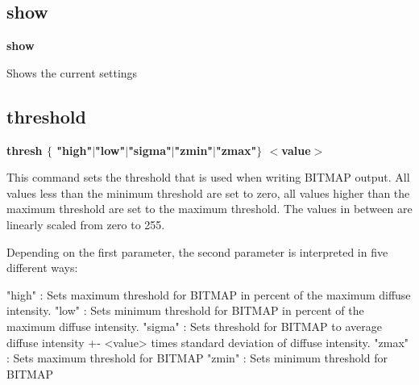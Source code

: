 \subsection*{show}
{\bf show \par }
\par
\vspace{3pt}
Shows the current settings 
\subsection*{threshold}
{\bf thresh $ \{$ "high"$| $"low"$| $"sigma"$| $"zmin"$| $"zmax"$\} $ $ <$value$> $ \par }
\par
\vspace{3pt}
This command sets the threshold that is used when writing BITMAP output. 
All values less than the minimum threshold are set to zero, 
all values higher than the maximum threshold are set to the 
maximum threshold. The values in between are linearly scaled from zero 
to 255. 
\par
Depending on the first parameter, the second parameter is interpreted in 
five different ways: 
\par
\begin{MacVerbatim}
"high"  : Sets maximum threshold for BITMAP in percent of the maximum
          diffuse intensity.
"low"   : Sets minimum threshold for BITMAP in percent of the maximum
          diffuse intensity.
"sigma" : Sets threshold for BITMAP to average diffuse intensity
          +- <value> times standard deviation of diffuse intensity.
"zmax"  : Sets maximum threshold for BITMAP
"zmin"  : Sets minimum threshold for BITMAP
\end{MacVerbatim}
